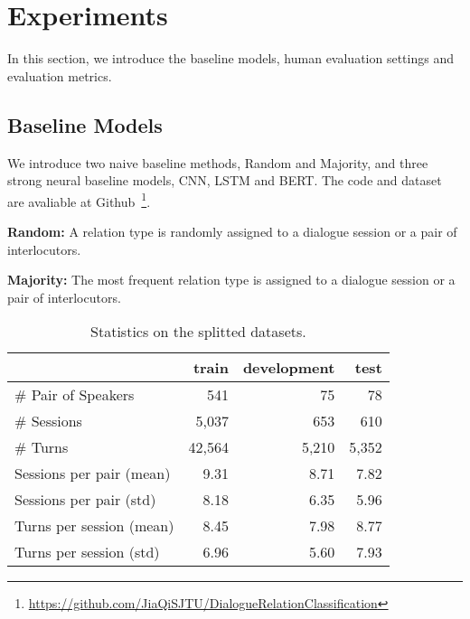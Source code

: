 \section{Experiments}
\label{experiments}


In this section, we introduce the baseline models, human evaluation settings and evaluation metrics.




\subsection{Baseline Models}
\label{sec:baselines}
We introduce two naive baseline methods, Random and Majority, and three strong neural
baseline models, CNN, LSTM and BERT. 
The code and dataset are avaliable at Github~\footnote{\url{https://github.com/JiaQiSJTU/DialogueRelationClassification}}.

\textbf{Random:} A relation type is randomly assigned to a dialogue session or a pair of interlocutors.

\textbf{Majority:} The most frequent relation type is assigned to a dialogue session or a pair of interlocutors.


\begin{table}[h!]
	\centering
	\small
	\begin{tabular}{@{}lrrr@{}}
		\toprule[1.5pt]
		\textbf{}                				& \textbf{train} & \textbf{development} & \textbf{test} \\ 
		\hline
		\# Pair of Speakers      		  &   541     &  75     &   78  \\
		\# Sessions             			 &     5,037   &    653    &  610  \\
		\# Turns                			   &   42,564     &    5,210    &  5,352  \\
		Sessions per pair (mean)  	  &    9.31    &   8.71     &  7.82  \\
		Sessions per pair (std)        &    8.18    &   6.35     & 5.96   \\
		Turns per session (mean)    &    8.45     &   7.98     &   8.77 \\
		Turns per session (std)      &    6.96     &   5.60     &  7.93  \\
		\bottomrule[1.5pt]
		
	\end{tabular}
	\caption{Statistics on the splitted datasets.}\label{table:dataset}
\end{table}



